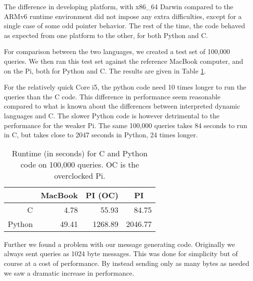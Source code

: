 The difference in developing platform, with x86\_64 Darwin compared to the ARMv6 runtime environment did not impose any extra difficulties, except for a single case of some odd pointer behavior.
The rest of the time, the code behaved as expected from one platform to the other, for both Python and C.

For comparison between the two languages, we created a test set of 100,000 queries. We then ran this test set against the reference MacBook computer, and on the Pi, both for Python and {C}.
The results are given in Table \ref{tbl:runtimes_ports}.

For the relatively quick {Core i5}, the python code need 10 times longer to run the queries than the C code. This difference in performance seem reasonable compared to what is known about the differences between interpreted dynamic languages and C.
The slower Python code is however detrimental to the performance for the weaker Pi. The same 100,000 queries takes 84 seconds to run in C, but takes close to 2047 seconds in Python, 24 times longer.

\begin{table}[h]
    \begin{center}
    \begin{tabular}{|r|r|r|r|}
    \hline
       & \multicolumn{1}{|c|}{MacBook} & \multicolumn{1}{|c|}{PI (OC)}  & \multicolumn{1}{|c|}{PI} \\
    \hline
    C      & 4.78 & 55.93 & 84.75     \\
    \hline
    Python & 49.41 & 1268.89 & 2046.77   \\

    \hline
    \end{tabular}
    \caption{Runtime (in seconds) for C and Python code on 100,000 queries. OC is the overclocked Pi.}
    \label{tbl:runtimes_ports}
    \end{center}
\end{table}

Further we found a problem with our message generating code. Originally we always sent queries as 1024 byte messages. This was done for simplicity but of course at a cost of performance. By instead sending only as many bytes as needed we saw a dramatic increase in performance.











